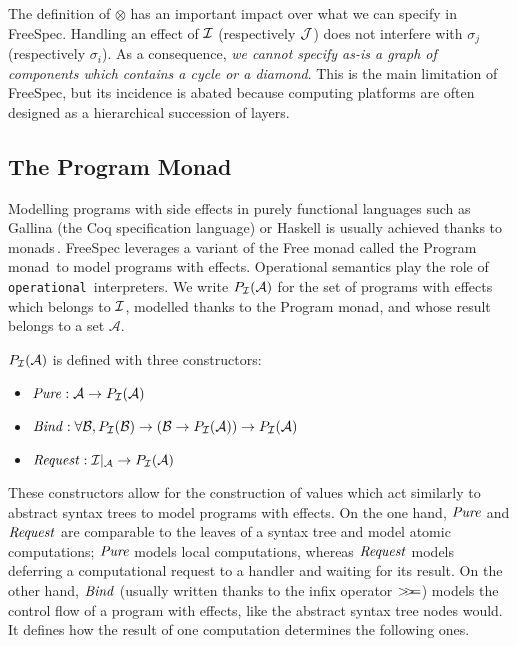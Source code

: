The definition of $\otimes$ has an important impact over what we can specify in
FreeSpec.
%
%
Handling an effect of $\mathcal{I}$ (respectively $\mathcal{J}$) does not interfere with
$\sigma_j$ (respectively $\sigma_i$).
%
As a consequence, \emph{we cannot specify as-is a graph of components which
  contains a cycle or a diamond}.
%
This is the main limitation of FreeSpec, but its incidence is abated because
computing platforms are often designed as a hierarchical succession of layers.

\subsection{The Program Monad}

Modelling programs with side effects in purely functional languages such as
{\textsc Gallina} (the Coq specification language) or Haskell is usually
achieved thanks to monads\,\cite{hoareetal2001monad}.
%
FreeSpec leverages a variant of the Free monad called the Program
monad\,\cite{operational} to model programs with effects. Operational semantics
play the role of \texttt{operational}\,\cite{operational} interpreters.
%
We write $P_{\mathcal{I}}(\mathcal{A})$ for the set of programs with effects which
belongs to $\mathcal{I}$, modelled thanks to the Program monad, and whose result belongs
to a set $\mathcal{A}$.

\begin{definition}
  $P_{\mathcal{I}}(\mathcal{A})$ is defined with three constructors:
  \begin{itemize}
  \item $\mathit{Pure} : \mathcal{A} \rightarrow P_{\mathcal{I}}(\mathcal{A})$
  \item
    $\mathit{Bind} : \forall \mathcal{B}, P_{\mathcal{I}}(\mathcal{B}) \rightarrow
    (\mathcal{B} \rightarrow P_{\mathcal{I}}(\mathcal{A})) \rightarrow
    P_{\mathcal{I}}(\mathcal{A})$
  \item
    $\mathit{Request} : \mathcal{I}|_{\mathcal{A}} \rightarrow
    P_{\mathcal{I}}(\mathcal{A})$
  \end{itemize}
\end{definition}
%
These constructors allow for the construction of values which act similarly to
abstract syntax trees to model programs with effects.
%
On the one hand, $\mathit{Pure}$ and $\mathit{Request}$ are comparable to the leaves
of a syntax tree and model atomic computations; $\mathit{Pure}$ models local
computations, whereas $\mathit{Request}$ models deferring a computational request
to a handler and waiting for its result.
%
On the other hand, $\mathit{Bind}$ (usually written thanks to the infix operator
$>\!\!>\!\!=$) models the control flow of a program with effects, like the abstract
syntax tree nodes would.
%
It defines how the result of one computation determines the following ones.

